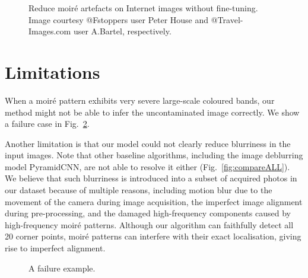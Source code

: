 \documentclass[journal]{IEEEtran}
\begin{document}
\begin{figure}[htb!]
\begin{center}
\end{center}
\addtocounter{subfigure}{-3}
\vspace{-1.2em}
\begin{center}
\end{center}
 \caption{Reduce moir\'{e} artefacts on Internet images without fine-tuning. Image courtesy @Fstoppers user Peter House and @Travel-Images.com user A.Bartel, respectively.}
\label{fig:online2}
\end{figure}


\section{Limitations }
When a moir\'{e} pattern exhibits very severe large-scale coloured bands, our method might not be able to infer the uncontaminated image correctly. We show a failure case in Fig.~\ref{fig:failure}.

Another limitation is that our model could not clearly reduce blurriness in the input images. Note that other baseline algorithms, including the image deblurring model PyramidCNN, are not able to resolve it either (Fig.~\ref{fig:compareALL}). We believe that such blurriness is introduced into a subset of acquired photos in our dataset because of multiple reasons, including motion blur due to the movement of the camera during image acquisition, the imperfect image alignment during pre-processing, and the damaged high-frequency components caused by high-frequency moir\'{e} patterns. Although our algorithm can faithfully detect all 20 corner points, moir\'{e} patterns can interfere with their exact localisation, giving rise to imperfect alignment.




\begin{figure}[thb!]
\begin{center}
\end{center}

\caption{A failure example. }
\label{fig:failure}
\end{figure}
\end{document}
